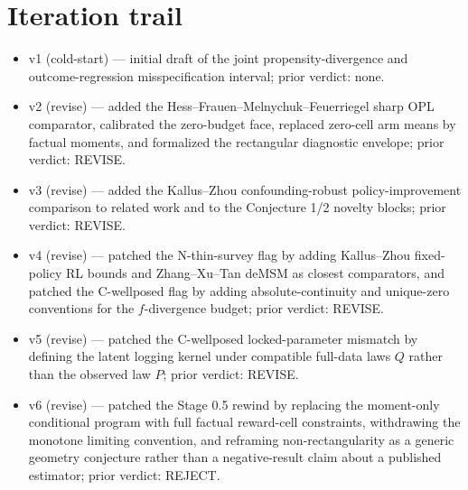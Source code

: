 \documentclass[11pt]{article}
\theoremstyle{definition}
\theoremstyle{plain}
\theoremstyle{remark}
\begin{document}
\section{Iteration trail}
\begin{itemize}[leftmargin=*]
\item v1 (cold-start) --- initial draft of the joint propensity-divergence and outcome-regression misspecification interval; prior verdict: none.
\item v2 (revise) --- added the Hess--Frauen--Melnychuk--Feuerriegel sharp OPL comparator, calibrated the zero-budget face, replaced zero-cell arm means by factual moments, and formalized the rectangular diagnostic envelope; prior verdict: REVISE.
\item v3 (revise) --- added the Kallus--Zhou confounding-robust policy-improvement comparison to related work and to the Conjecture 1/2 novelty blocks; prior verdict: REVISE.
\item v4 (revise) --- patched the N-thin-survey flag by adding Kallus--Zhou fixed-policy RL bounds and Zhang--Xu--Tan deMSM as closest comparators, and patched the C-wellposed flag by adding absolute-continuity and unique-zero conventions for the $f$-divergence budget; prior verdict: REVISE.
\item v5 (revise) --- patched the C-wellposed locked-parameter mismatch by defining the latent logging kernel under compatible full-data laws $Q$ rather than the observed law $P$; prior verdict: REVISE.
\item v6 (revise) --- patched the Stage 0.5 rewind by replacing the moment-only conditional program with full factual reward-cell constraints, withdrawing the monotone limiting convention, and reframing non-rectangularity as a generic geometry conjecture rather than a negative-result claim about a published estimator; prior verdict: REJECT.
\end{itemize}
\end{document}
